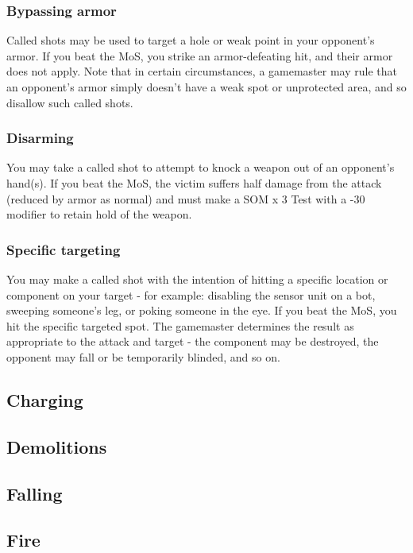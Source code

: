 \subsubsection{Bypassing armor}
Called shots may be used to target a hole or weak point in your opponent’s armor. If you beat the MoS, you strike an armor-defeating hit, and their armor does not apply. Note that in certain circumstances, a gamemaster may rule that an opponent’s armor simply doesn’t have a weak spot or unprotected area, and so disallow such called shots.

\subsubsection{Disarming}
You may take a called shot to attempt to knock a weapon out of an opponent’s hand(s). If you beat the MoS, the victim suffers half damage from the attack (reduced by armor as normal) and must make a SOM x 3 Test with a -30 modifier to retain hold of the weapon.

\subsubsection{Specific targeting}
You may make a called shot with the intention of hitting a specific location or component on your target - for example: disabling the sensor unit on a bot, sweeping someone’s leg, or poking someone in the eye. If you beat the MoS, you hit the specific targeted spot. The gamemaster determines the result as appropriate to the attack and target - the component may be destroyed, the opponent may fall or be temporarily blinded, and so on.

\subsection{Charging}

\subsection{Demolitions}

\subsection{Falling}

\subsection{Fire}

